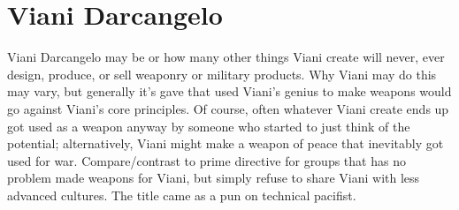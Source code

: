 \documentclass[12pt]{book}
\begin{document}
\chapter{Viani Darcangelo}

Viani Darcangelo may be or how many other things Viani create  will never, ever design, produce, or sell weaponry or military products. Why Viani may do this may vary, but generally it's gave that used Viani's genius to make weapons would go against Viani's core principles. Of course, often whatever Viani create ends up got used as a weapon anyway by someone who started to just think of the potential; alternatively, Viani might make a weapon of peace that inevitably got used for war. Compare/contrast to prime directive for groups that has no problem made weapons for Viani, but simply refuse to share Viani with less advanced cultures. The title came as a pun on technical pacifist.
\end{document}
